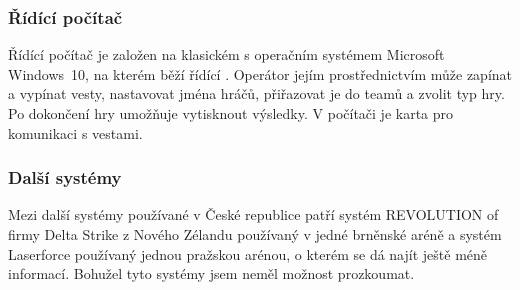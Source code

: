 \subsubsection{Řídící počítač}
Řídící počítač je založen na klasickém  s operačním systémem Microsoft Windows~10, na kterém běží řídící . Operátor jejím prostřednictvím může zapínat a vypínat vesty, nastavovat jména hráčů, přiřazovat je do teamů a zvolit typ hry. Po dokončení hry umožňuje  vytisknout výsledky. V počítači je  karta pro komunikaci s vestami.


\subsubsection{Další systémy}
Mezi další systémy používané v České republice patří systém REVOLUTION of firmy Delta Strike z Nového Zélandu používaný v jedné brněnské aréně a systém Laserforce používaný jednou pražskou arénou, o kterém se dá najít ještě méně informací. Bohužel tyto systémy jsem neměl možnost prozkoumat.
